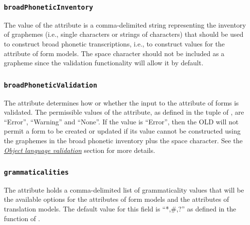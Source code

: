 \documentclass[letterpaper,10pt,english]{sphinxmanual}
\begin{document}
\subsubsection{\texttt{broadPhoneticInventory}}
\label{datastructure:broadphoneticinventory}
The value of the  attribute is a comma-delimited
string representing the inventory of graphemes (i.e., single characters or
strings of characters) that should be used to construct broad phonetic
transcriptions, i.e., to construct values for the 
attribute of form models.  The space character should not be included as a
grapheme since the validation functionality will allow it by default.


\subsubsection{\texttt{broadPhoneticValidation}}
\label{datastructure:broadphoneticvalidation}
The  attribute determines how or whether the input to
the  attribute of forms is validated.  The permissible
values of the  attribute, as defined in the
 tuple of , are ``Error'', ``Warning'' and
``None''.  If the value is ``Error'', then the OLD will not permit a form to be
created or updated if its  value cannot be
constructed using the graphemes in the broad phonetic inventory plus the space
character.  See the {\hyperref[interface:object-language-validation]{\emph{Object language validation}}} section for more details.


\subsubsection{\texttt{grammaticalities}}
\label{datastructure:grammaticalities}
The  attribute holds a comma-delimited list of
grammaticality values that will be the available options for the
 attributes of form models and the 
attributes of translation models.  The default value for this field is ``*,\#,?'' as
defined in the  function of
.
\end{document}
